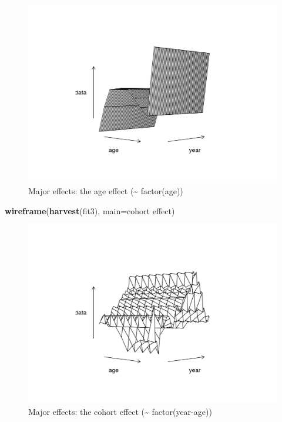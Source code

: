 \documentclass[
]{book}
\newenvironment{Shaded}{\begin{snugshade}}{\end{snugshade}}
\newcommand{\AttributeTok}[1]{\textcolor[rgb]{0.13,0.29,0.53}{#1}}
\newcommand{\FunctionTok}[1]{\textcolor[rgb]{0.13,0.29,0.53}{\textbf{#1}}}
\newcommand{\NormalTok}[1]{#1}
\newcommand{\StringTok}[1]{\textcolor[rgb]{0.31,0.60,0.02}{#1}}
\begin{document}
\begin{figure}
\centering
\includegraphics{_bookdown_files/_main_files/figure-html/majeffa-1.png}
\caption{\label{fig:majeffa}Major effects: the age effect (\textasciitilde{} factor(age))}
\end{figure}

\begin{Shaded}
\begin{Highlighting}[]
\FunctionTok{wireframe}\NormalTok{(}\FunctionTok{harvest}\NormalTok{(fit3), }\AttributeTok{main=}\StringTok{\textquotesingle{}cohort effect\textquotesingle{}}\NormalTok{)}
\end{Highlighting}
\end{Shaded}

\begin{figure}
\centering
\includegraphics{_bookdown_files/_main_files/figure-html/majeffc-1.png}
\caption{\label{fig:majeffc}Major effects: the cohort effect (\textasciitilde{} factor(year-age))}
\end{figure}
\end{document}
